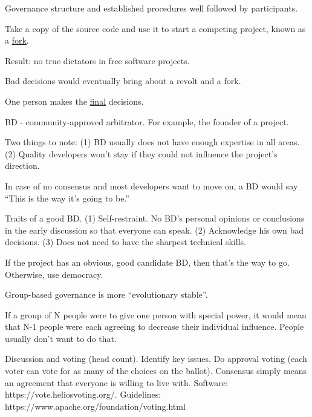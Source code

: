 \documentclass[landscape,30pt]{foils}
\begin{document}
Governance structure and established procedures well followed by participants.



Take a copy of the source code and use it to start a competing project, known as a \underline{fork}.

Result: no true dictators in free software projects.

Bad decisions would eventually bring about a revolt and a fork.



One person makes the \underline{final} decisions.

BD - community-approved arbitrator. For example, the founder of a project.

Two things to note: (1) BD usually does not have enough expertise in all areas.  (2) Quality developers won't stay if they could not influence the project's direction.

In case of no consensus and most developers want to move on, a BD would say ``This is the way it's going to be.''

Traits of a good BD.  (1) Self-restraint.  No BD's personal opinions or conclusions in the early discussion so that everyone can speak.  (2) Acknowledge his own bad decisions. (3) Does not need to have the sharpest technical skills.

If the project has an obvious, good candidate BD, then that's the way to go.  Otherwise, use democracy.


Group-based governance is more ``evolutionary stable''.

If a group of N people were to give one person with special power, it would mean that N-1 people were each agreeing
to decrease their individual influence.  People usually don't want to do that.

Discussion and voting (head count).  Identify key issues.  Do approval voting (each voter can vote for as many of the choices on the ballot).   Consensus simply means an agreement that everyone is willing to live with.  Software: https://vote.heliosvoting.org/. Guidelines: https://www.apache.org/foundation/voting.html
\end{document}
